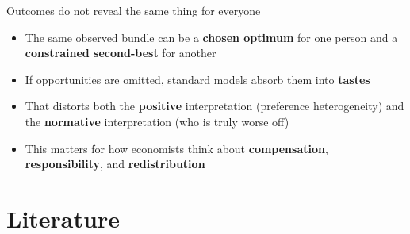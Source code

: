 \documentclass[aspectratio=169,11pt]{beamer}
\begin{document}
\begin{frame}{Outcomes do not reveal the same thing for everyone}

\begin{itemize}
\item The same observed bundle can be a \textbf{chosen optimum} for one person and a \textbf{constrained second-best} for another
\item If opportunities are omitted, standard models absorb them into \textbf{tastes}
\item That distorts both the \textbf{positive} interpretation (preference heterogeneity) and the \textbf{normative} interpretation (who is truly worse off)
\item This matters for how economists think about \textbf{compensation}, \textbf{responsibility}, and \textbf{redistribution}
\end{itemize}

\vfill
\begin{center}
\end{center}
\end{frame}

\section{Literature}
\end{document}
